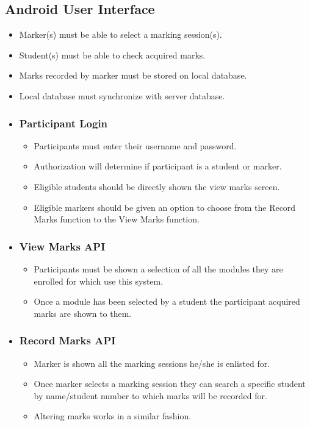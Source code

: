 \documentclass[10pt,a4paper]{article}
\begin{document}
	\subsection*{Android User Interface}
	\begin{itemize}
		\item Marker(s) must be able to select a marking session(s).
		\item Student(s) must be able to check acquired marks.
		\item Marks recorded by marker must be stored on local database.
		\item Local database must synchronize with server database.
	
		\item \subsubsection*{Participant Login}
		\begin{itemize}
			\item Participants must enter their username and password.
			\item Authorization will determine if participant is a student or marker. 
			\item Eligible students should be directly shown the view marks screen.
			\item Eligible markers should be given an option to choose from the Record Marks function to the View Marks function.
		\end{itemize}
		
		\item \subsubsection*{View Marks API}
		\begin{itemize}
			\item Participants must be shown a selection of all the modules they are enrolled for which use this system. 
			\item Once a module has been selected by a student the participant acquired marks are shown to them.
		\end{itemize}
		
		\item \subsubsection*{Record Marks API}
		\begin{itemize}
			\item Marker is shown all the marking sessions he/she is enlisted for.
			\item Once marker selects a marking session they can search a specific student by name/student number to which marks will be recorded for.
			\item Altering marks works in a similar fashion.
		\end{itemize}
	\end{itemize}
\end{document}
